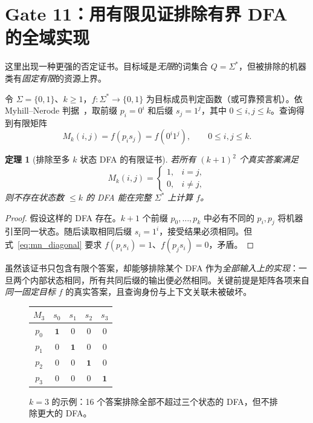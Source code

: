 \documentclass[11pt,a4paper,UTF8,fontset=none]{ctexart}
\newtheorem{theorem}{定理}[section]
\begin{document}
\section{Gate 11：用有限见证排除有界 DFA 的全域实现}

这里出现一种更强的否定证书。目标域是\emph{无限}的词集合 $Q=\Sigma^*$，但被排除的机器类有\emph{固定有限}的资源上界。

令 $\Sigma=\{0,1\}$、$k\ge1$，$f:\Sigma^*\to\{0,1\}$ 为目标成员判定函数（或可靠预言机）。依 Myhill--Nerode 判据~\cite{myhill1957,nerode1958}，取前缀 $p_i=0^i$ 和后缀 $s_j=1^j$，其中 $0\le i,j\le k$。查询得到有限矩阵
\begin{equation}\label{eq:mn_matrix}
M_k(i,j)=f(p_is_j)=f(0^i1^j),\qquad 0\le i,j\le k.
\end{equation}
\begin{theorem}[排除至多 $k$ 状态 DFA 的有限证书]\label{thm:bounded_dfa}
若所有 $(k+1)^2$ 个真实答案满足
\begin{equation}\label{eq:mn_diagonal}
M_k(i,j)=\begin{cases}1,&i=j,\\0,&i\ne j,\end{cases}
\end{equation}
则\emph{不存在}状态数 $\le k$ 的 DFA 能在完整 $\Sigma^*$ 上计算 $f$。
\end{theorem}
\begin{proof}
假设这样的 DFA 存在。$k+1$ 个前缀 $p_0,\ldots,p_k$ 中必有不同的 $p_i,p_j$ 将机器引至同一状态。随后读取相同后缀 $s_i=1^i$，接受结果必须相同。但式~\eqref{eq:mn_diagonal} 要求 $f(p_is_i)=1$、$f(p_js_i)=0$，矛盾。
\end{proof}

虽然该证书只包含有限个答案，却能够排除某个 DFA 作为\emph{全部输入上的实现}：一旦两个内部状态相同，所有共同后缀的输出便必然相同。关键前提是矩阵各项来自\emph{同一固定目标} $f$ 的真实答案，且查询身份与上下文关联未被破坏。

\begin{figure}[htbp]
\centering
\begin{tabular}{c|cccc}
$M_3$ & $s_0$ & $s_1$ & $s_2$ & $s_3$\\ \hline
$p_0$ & $\mathbf 1$ & 0 & 0 & 0\\
$p_1$ & 0 & $\mathbf 1$ & 0 & 0\\
$p_2$ & 0 & 0 & $\mathbf 1$ & 0\\
$p_3$ & 0 & 0 & 0 & $\mathbf 1$
\end{tabular}
\caption{$k=3$ 的示例：16 个答案排除全部不超过三个状态的 DFA，但不排除更大的 DFA。}\label{fig:matrix}
\end{figure}
\end{document}

